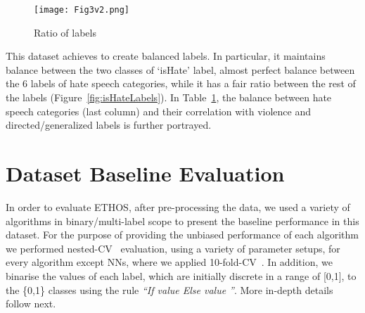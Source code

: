 \documentclass{article}
\begin{document}
\begin{figure}[ht]
\centering
{}
\centering
\texttt{[image: Fig3v2.png]}
\caption{Ratio of labels}
\label{fig:isHateLabels}
\endminipage\hfill
{}
\centering
{}
\label{tab:correlTable}
\endminipage
\end{figure}

This dataset achieves to create balanced labels. In particular, it maintains balance between the two classes of `isHate' label, almost perfect balance between the 6 labels of hate speech categories, while it has a fair ratio between the rest of the labels (Figure~\ref{fig:isHateLabels}). In Table~\ref{tab:correlTable}, the balance between hate speech categories (last column) and their correlation with violence and directed/generalized labels is further portrayed.

\section{Dataset Baseline Evaluation}
In order to evaluate ETHOS, after pre-processing the data, we used a variety of algorithms in binary/multi-label scope to present the baseline performance in this dataset. For the purpose of providing the unbiased performance of each algorithm we performed nested-CV~\cite{nestedCrossValidation} evaluation, using a variety of parameter setups, for every algorithm except NNs, where we applied 10-fold-CV~\cite{crossValidation}. In addition, we binarise the values of each label, which are initially discrete in a range of [0,1], to the \{0,1\} classes using the rule \textit{``If value  Else value ''}. More in-depth details follow next.
\end{document}
